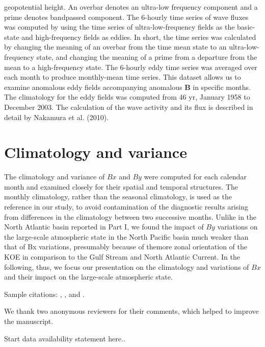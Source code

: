 \documentclass{ametsocV5}
\begin{document}
geopotential height. An overbar denotes an ultra-low frequency
component and a prime denotes bandpassed
component. The 6-hourly time series of wave fluxes was
computed by using the time series of ultra-low-frequency
fields as the basic-state and high-frequency fields as eddies.
In short, the time series was calculated by changing the
meaning of an overbar from the time mean state to an
ultra-low-frequency state, and changing the meaning of a
prime from a departure from the mean to a high-frequency
state. The 6-hourly eddy time series was averaged over each
month to produce monthly-mean time series. This dataset
allows us to examine anomalous eddy fields accompanying
anomalous $\mathbf B$ in specific months. The climatology for
the eddy fields was computed from 46 yr, January 1958 to
December 2003. The calculation of the wave activity and
its flux is described in detail by Nakamura et al. (2010).


\section{Climatology and variance}
The climatology and variance of $Bx$ and $By$ were computed
for each calendar month and examined closely for
their spatial and temporal structures. The monthly climatology,
rather than the seasonal climatology, is used as the
reference in our study, to avoid contamination of the diagnostic
results arising from differences in the climatology
between two successive months. Unlike in the North Atlantic
basin reported in Part I, we found the impact of $By$
variations on the large-scale atmospheric state in the
North Pacific basin much weaker than that of Bx variations,
presumably because of themore zonal orientation of
the KOE in comparison to the Gulf Stream and North
Atlantic Current. In the following, thus, we focus our
presentation on the climatology and variations of $Bx$ and
their impact on the large-scale atmospheric state.

Sample citations: \citet{Becker+Schmitz2003}, \citet{Knutti2008},
and \citep{MeixnerEA2002,Kuji_Nakajima2002,EmeryEA1986}.

\acknowledgments
We thank two anonymous reviewers for their comments, which helped
to improve the manuscript.

\datastatement
Start data availability statement here..
\end{document}
